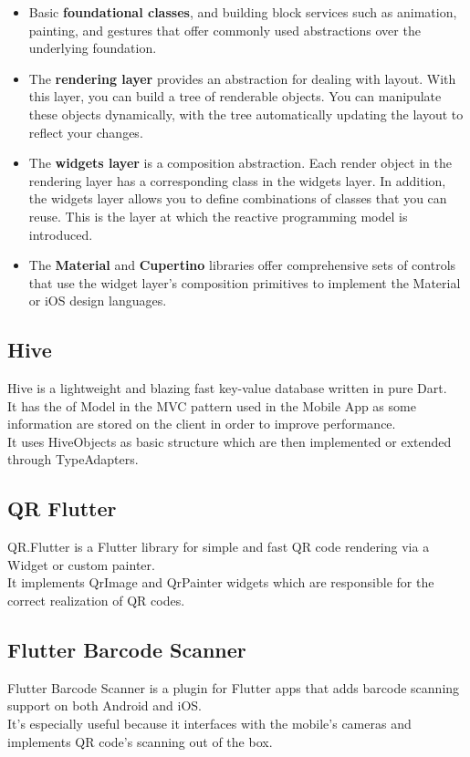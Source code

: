 \documentclass[table, 12pt]{article}
\begin{document}
\begin{itemize}
    \item Basic \textbf{foundational classes}, and building block services such as animation, painting, and gestures that offer commonly used abstractions over the underlying foundation.
    \item The \textbf{rendering layer} provides an abstraction for dealing with layout. With this layer, you can build a tree of renderable objects. You can manipulate these objects dynamically, with the tree automatically updating the layout to reflect your changes.
    \item The \textbf{widgets layer} is a composition abstraction. Each render object in the rendering layer has a corresponding class in the widgets layer. In addition, the widgets layer allows you to define combinations of classes that you can reuse. This is the layer at which the reactive programming model is introduced.
    \item The \textbf{Material} and \textbf{Cupertino} libraries offer comprehensive sets of controls that use the widget layer’s composition primitives to implement the Material or iOS design languages.
\end{itemize}
\subsection{Hive}
Hive is a lightweight and blazing fast key-value database written in pure Dart.\\
It has the of Model in the MVC pattern used in the Mobile App as some information are stored on the client in order to improve performance.\\
It uses HiveObjects as basic structure which are then implemented or extended through TypeAdapters.
\subsection{QR Flutter}
QR.Flutter is a Flutter library for simple and fast QR code rendering via a Widget or custom painter.\\
It implements QrImage and QrPainter widgets which are responsible for the correct realization of QR codes.
\subsection{Flutter Barcode Scanner}
Flutter Barcode Scanner is a plugin for Flutter apps that adds barcode scanning support on both Android and iOS.\\
It's especially useful because it interfaces with the mobile's cameras and implements QR code's scanning out of the box.
\end{document}
